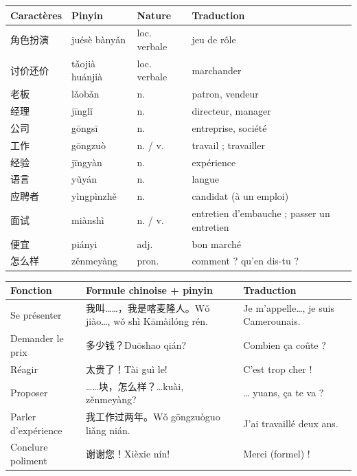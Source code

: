 \documentclass[11pt]{article}
\begin{document}
\begin{center}
\begin{tabularx}{\linewidth}{|X|X|X|X|}
\hline
\rowcolor{popblueL} Caractères & Pinyin & Nature & Traduction \\
\hline
角色扮演 & juésè bànyǎn & loc. verbale & jeu de rôle \\
\hline
讨价还价 & tǎojià huánjià & loc. verbale & marchander \\
\hline
老板 & lǎobǎn & n. & patron, vendeur \\
\hline
经理 & jīnglǐ & n. & directeur, manager \\
\hline
公司 & gōngsī & n. & entreprise, société \\
\hline
工作 & gōngzuò & n. / v. & travail ; travailler \\
\hline
经验 & jīngyàn & n. & expérience \\
\hline
语言 & yǔyán & n. & langue \\
\hline
应聘者 & yìngpìnzhě & n. & candidat (à un emploi) \\
\hline
面试 & miànshì & n. / v. & entretien d'embauche ; passer un entretien \\
\hline
便宜 & piányi & adj. & bon marché \\
\hline
怎么样 & zěnmeyàng & pron. & comment ? qu'en dis-tu ? \\
\hline
\end{tabularx}
\end{center}

\begin{center}
\begin{tabularx}{\linewidth}{|X|X|X|}
\hline
\rowcolor{popblueL} Fonction & Formule chinoise + pinyin & Traduction \\
\hline
Se présenter & 我叫……，我是喀麦隆人。Wǒ jiào…, wǒ shì Kāmàilóng rén. & Je m'appelle…, je suis Camerounais. \\
\hline
Demander le prix & 多少钱？Duōshao qián? & Combien ça coûte ? \\
\hline
Réagir & 太贵了！Tài guì le! & C'est trop cher ! \\
\hline
Proposer & ……块，怎么样？…kuài, zěnmeyàng? & … yuans, ça te va ? \\
\hline
Parler d'expérience & 我工作过两年。Wǒ gōngzuòguo liǎng nián. & J'ai travaillé deux ans. \\
\hline
Conclure poliment & 谢谢您！Xièxie nín! & Merci (formel) ! \\
\hline
\end{tabularx}
\end{center}
\end{document}
